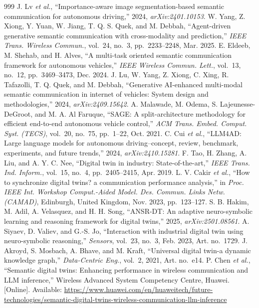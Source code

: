\begin{thebibliography}{999}
 J. Lv \emph{et al.}, ``Importance-aware image segmentation-based semantic communication for autonomous driving,'' 2024, \emph{arXiv:2401.10153}.
 W. Yang, Z. Xiong, Y. Yuan, W. Jiang, T. Q. S. Quek, and M. Debbah, ``Agent-driven generative semantic communication with cross-modality and prediction,'' \emph{IEEE Trans. Wireless Commun.}, vol.~24, no.~3, pp.~2233--2248, Mar. 2025.
 E. Eldeeb, M. Shehab, and H. Alves, ``A multi-task oriented semantic communication framework for autonomous vehicles,'' \emph{IEEE Wireless Commun. Lett.}, vol.~13, no.~12, pp.~3469--3473, Dec. 2024.
 J. Lu, W. Yang, Z. Xiong, C. Xing, R. Tafazolli, T. Q. Quek, and M. Debbah, ``Generative AI-enhanced multi-modal semantic communication in internet of vehicles: System design and methodologies,'' 2024, \emph{arXiv:2409.15642}.
 A. Malawade, M. Odema, S. Lajeunesse-DeGroot, and M. A. Al Faruque, ``SAGE: A split-architecture methodology for efficient end-to-end autonomous vehicle control,'' \emph{ACM Trans. Embed. Comput. Syst. (TECS)}, vol.~20, no.~75, pp.~1--22, Oct. 2021.
 C. Cui \emph{et al.}, ``LLM4AD: Large language models for autonomous driving--concept, review, benchmark, experiments, and future trends,'' 2024, \emph{arXiv:2410.15281}.
 F. Tao, H. Zhang, A. Liu, and A. Y. C. Nee, ``Digital twin in industry: State-of-the-art,'' \emph{IEEE Trans. Ind. Inform.}, vol.~15, no.~4, pp.~2405--2415, Apr. 2019.
 L. V. Cakir \emph{et al.}, ``How to synchronize digital twins? a communication performance analysis,'' in \emph{Proc. IEEE Int. Workshop Comput.-Aided Model. Des. Commun. Links Netw. (CAMAD)}, Edinburgh, United Kingdom, Nov. 2023, pp.~123--127.
 S. B. Hakim, M. Adil, A. Velasquez, and H. H. Song, ``ANSR-DT: An adaptive neuro-symbolic learning and reasoning framework for digital twins,'' 2025, \emph{arXiv:2501.08561}.
 A. Siyaev, D. Valiev, and G.-S. Jo, ``Interaction with industrial digital twin using neuro-symbolic reasoning,'' \emph{Sensors}, vol.~23, no.~3, Feb. 2023, Art. no.~1729.
 J. Akroyd, S. Mosbach, A. Bhave, and M. Kraft, ``Universal digital twin-a dynamic knowledge graph,'' \emph{Data-Centric Eng.}, vol.~2, 2021, Art. no.~e14.
 P. Chen \emph{et al.}, ``Semantic digital twins: Enhancing performance in wireless communication and LLM inference,'' Wireless Advanced System Competency Centre, Huawei. [Online]. Available: \url{https://www.huawei.com/en/huaweitech/future-technologies/semantic-digital-twins-wireless-communication-llm-inference}

\end{thebibliography}
